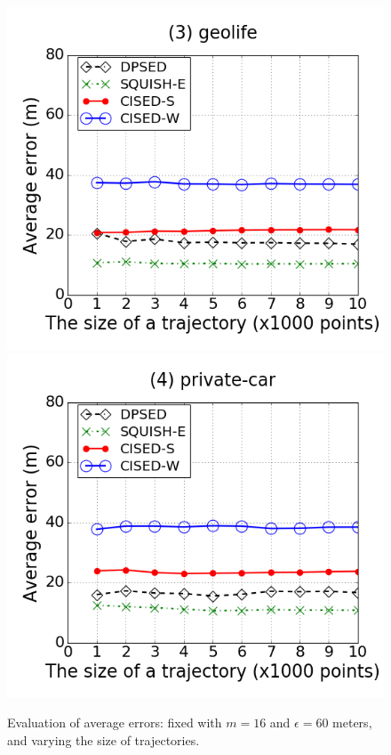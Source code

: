 \begin{figure}[tb!]
\includegraphics[scale = 0.250]{figures/Exp-error-size-geolife.png}
\includegraphics[scale = 0.250]{figures/Exp-error-size-private.png}
\vspace{-2ex}
\caption{\small Evaluation of average errors: fixed with $m=16$ and $\epsilon=60$ meters, and varying the size of trajectories.}
\label{fig:ae-size}
\vspace{-2ex}
\end{figure}


